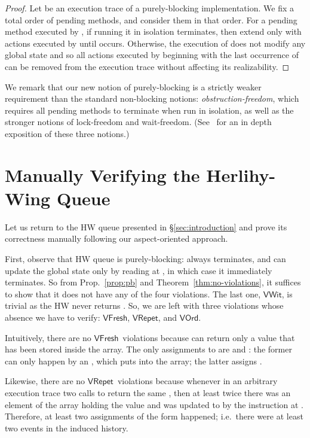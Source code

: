 \documentclass{LMCS}
\newcommand{\VFresh}{\ensuremath{\mathsf{VFresh}}}
\newcommand{\VRepet}{\ensuremath{\mathsf{VRepet}}}
\newcommand{\VOrd}{\ensuremath{\mathsf{VOrd}}}
\newcommand{\VWit}{\ensuremath{\mathsf{VWit}}}
\begin{document}
\begin{proof}
Let  be an execution trace of a purely-blocking implementation.
We fix a total order of pending methods, and consider them in that order. 
For a pending method  executed by , if running it in isolation terminates, then extend  only with actions executed by  until  occurs.
Otherwise, the execution of  does not modify any global state and so all actions executed by  beginning with the last occurrence of  can be removed from the execution trace without affecting its realizability.
\end{proof}

We remark that our new notion of purely-blocking is a strictly weaker
requirement than the standard non-blocking notions:
\emph{obstruction-freedom}, which requires all pending methods to terminate when run in isolation, 
as well as the stronger notions of lock-freedom and wait-freedom.
(See~\cite{HS2008} for an in depth exposition of these three notions.)



\section{Manually Verifying the Herlihy-Wing Queue}
\label{sec:herlihy-wing}

Let us return to the HW queue presented in \S\ref{sec:introduction} and prove
its correctness manually following our aspect-oriented approach.

First, observe that HW queue is purely-blocking:  always terminates,
and  can update the global state only by reading  at ,
in which case it immediately terminates.
So from Prop.~\ref{prop:pb} and Theorem~\ref{thm:no-violations}, it suffices
to show that it does not have any of the four violations.
The last one, \VWit, is trivial as the HW  never returns .
So, we are left with three violations
whose absence we have to verify: \VFresh, \VRepet, and \VOrd. 

Intuitively, there are no \VFresh\ violations because  can return only a value that
has been stored inside the  array.  The only assignments to 
are  and : the former can only happen by an , which puts  into
the array; the latter assigns .

Likewise, there are no \VRepet\ violations because whenever in an arbitrary execution trace two calls to
 return the same , then at least twice there was an element of 
the  array holding the value  and was updated to  by
the  instruction at .
Therefore, at least two assignments of the form  happened; 
i.e.\ there were at least two  events in the induced history.
\end{document}
